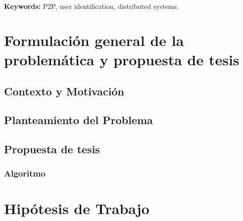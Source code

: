 \documentclass[12pt,spanish]{article}
\begin{document}
{\begin{minipage}[b]{0.9\textwidth}
{\bf Keywords:} P2P, user identification, distributed systems.

\end{minipage}
}

\vfill
\section{Formulación general de la problemática y propuesta de tesis}



\subsection{Contexto y Motivación}


\subsection{Planteamiento del Problema}


\subsection{Propuesta de tesis}


\subsubsection{Algoritmo}



\section{Hipótesis de Trabajo}

\newpage
\end{document}

